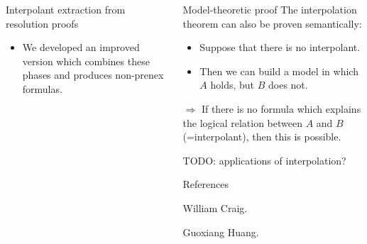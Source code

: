 \documentclass[final,hyperref={pdfpagelabels=true}]{beamer}
\begin{document}
\begin{frame}
\begin{columns}[t]
\begin{column}{\mycolwidth}
\begin{block}{Interpolant extraction from resolution proofs}
\begin{itemize}
					\item We developed an improved version which combines these phases and produces non-prenex formulas.
				\end{itemize}



			\end{block}

		\end{column}
		\begin{column}{\mycolwidth}

			\begin{block}{Model-theoretic proof}
				The interpolation theorem can also be proven semantically:
				\begin{itemize}
					\item Suppose that there is no interpolant.
					\item Then we can build a model in which $A$ holds, but $B$ does not.

				\end{itemize}

				$\Rightarrow$ If there is no formula which explains the logical relation between $A$ and $B$ (=interpolant), then this is possible.
			\end{block}



			TODO: applications of interpolation? 


			\begin{block}{References}
				\begin{thebibliography}{999}

						William Craig.

						Guoxiang Huang.



\end{thebibliography}
\end{block}
\end{column}
\end{columns}
\end{frame}
\end{document}
